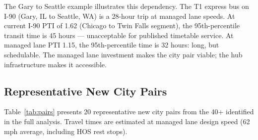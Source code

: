 The Gary to Seattle example illustrates this dependency. The T1 express bus on I-90 (Gary, IL to Seattle, WA) is a 28-hour trip at managed lane speeds. At current I-90 PTI of 1.62 (Chicago to Twin Falls segment), the 95th-percentile transit time is 45 hours --- unacceptable for published timetable service. At managed lane PTI 1.15, the 95th-percentile time is 32 hours: long, but schedulable. The managed lane investment makes the city pair viable; the hub infrastructure makes it accessible.

\subsection{Representative New City Pairs}

Table~\ref{tab:pairs} presents 20 representative new city pairs from the 40+ identified in the full analysis. Travel times are estimated at managed lane design speed (62 mph average, including HOS rest stops).

